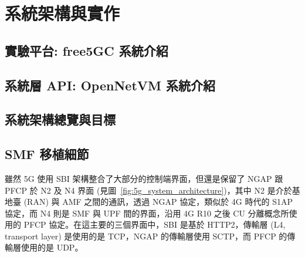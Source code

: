 \chapter{系統架構與實作}
\label{chapter:system}


\section{實驗平台: free5GC 系統介紹}
\label{sec:free5gc_intro}


\section{系統層 API: OpenNetVM 系統介紹}
\label{sec:opennetvm_intro}

\section{系統架構總覽與目標}
\label{sec:arch_intro}

\section{SMF 移植細節}
\label{sec:smf_porting}


雖然 5G 使用 SBI 架構整合了大部分的控制端界面，但還是保留了 NGAP 跟 PFCP 於 N2 及 N4 界面 (見圖~\ref{fig:5g_system_architecture})，其中 N2 是介於基地臺 (RAN) 與 AMF 之間的通訊，透過 NGAP 協定，類似於 4G 時代的 S1AP 協定，而 N4 則是 SMF 與 UPF 間的界面，沿用 4G R10 之後 CU 分離概念所使用的 PFCP 協定。在這主要的三個界面中，SBI 是基於 HTTP2，傳輸層 (L4, transport layer) 是使用的是 TCP，NGAP 的傳輸層使用 SCTP，而 PFCP 的傳輸層使用的是 UDP。

